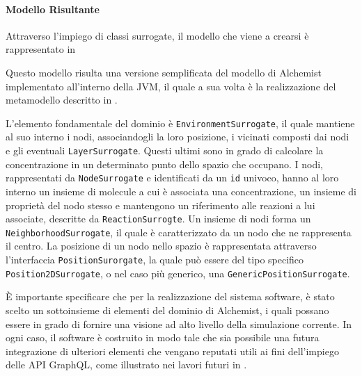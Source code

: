 \paragraph{Modello Risultante}
Attraverso l'impiego di classi surrogate, il modello che viene a crearsi è rappresentato in 


Questo modello risulta una versione semplificata del modello di Alchemist implementato all'interno della \ac{JVM}, il quale a sua volta è la realizzazione del metamodello
descritto in .

L'elemento fondamentale del dominio è \texttt{EnvironmentSurrogate}, il quale mantiene al suo interno i nodi, associandogli la loro posizione, i vicinati composti dai nodi
e gli eventuali \texttt{LayerSurrogate}. Questi ultimi sono in grado di calcolare la concentrazione in un determinato punto dello spazio che occupano. I nodi, rappresentati
da \texttt{NodeSurrogate} e identificati da un \texttt{id} univoco, hanno al loro interno un insieme di molecule a cui è associata una concentrazione, un insieme di proprietà
del nodo stesso e mantengono un riferimento alle reazioni a lui associate, descritte da \texttt{ReactionSurrogte}. Un insieme di nodi forma un \texttt{NeighborhoodSurrogate},
il quale è caratterizzato da un nodo che ne rappresenta il centro. La posizione di un nodo nello spazio è rappresentata attraverso l'interfaccia \texttt{PositionSurorgate},
la quale può essere del tipo specifico \texttt{Position2DSurrogate}, o nel caso più generico, una \texttt{GenericPositionSurrogate}.

È importante specificare che per la realizzazione del sistema software, è stato scelto un sottoinsieme di elementi del dominio di Alchemist, i quali possano essere in grado
di fornire una visione ad alto livello della simulazione corrente. In ogni caso, il software è costruito in modo tale che sia possibile una futura integrazione di ulteriori
elementi che vengano reputati utili ai fini dell'impiego delle \ac{API} GraphQL, come illustrato nei lavori futuri in .

